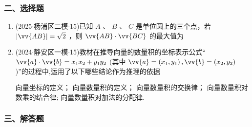 \subsubsection*{二、选择题}
\begin{enumerate}
    \item (2025$\cdot$杨浦区二模$\cdot$15)已知 $A$ 、 $B$ 、 $C$ 是单位圆上的三个点，若 $\left| \vv{AB}\right|  = \sqrt{2}$ ，则 $\vv{AB} \cdot \vv{BC}$ 的最大值为 

    \item (2024$\cdot$静安区一模$\cdot$15)教材在推导向量的数量积的坐标表示公式“$\vv{a} \cdot  \vv{b} = {x}_{1}{x}_{2} + {y}_{1}{y}_{2}$ (其中 $\vv{a} = \left( {{x}_{1},{y}_{1}}\right) ,\vv{b} = \left( {{x}_{2},{y}_{2}}\right)$ )”的过程中,运用了以下哪些结论作为推理的依据 
    
      向量坐标的定义；   向量数量积的定义；   向量数量积的交换律；   向量数量积对数乘的结合律;    向量数量积对加法的分配律.
\end{enumerate}
\subsubsection*{三、解答题}

